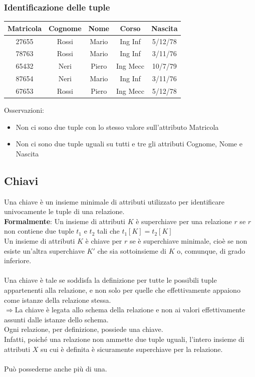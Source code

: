 \documentclass[../main.tex]{subfiles}
\begin{document}
	\subsubsection{Identificazione delle tuple}
	\begin{center}
		\begin{tabular}{ |c|c|c|c|c| }
			\hline
			\textbf{Matricola} & \textbf{Cognome} & \textbf{Nome} & \textbf{Corso} & \textbf{Nascita}\\
			\hline
			27655 & Rossi & Mario & Ing Inf & 5/12/78\\
			78763 & Rossi & Mario & Ing Inf & 3/11/76\\
			65432 & Neri & Piero & Ing Mecc & 10/7/79\\
			87654 & Neri & Mario & Ing Inf & 3/11/76\\
			67653 & Rossi & Piero & Ing Mecc & 5/12/78\\
			\hline
		\end{tabular}
	\end{center}
	Osservazioni:
	\begin{itemize}
		\item Non ci sono due tuple con lo stesso valore sull’attributo Matricola
		\item Non ci sono due tuple uguali su tutti e tre gli attributi Cognome, Nome e Nascita
	\end{itemize}
	\subsection{Chiavi}
	Una chiave è un insieme minimale di attributi utilizzato per identificare univocamente le tuple di una relazione.\\
	\textbf{Formalmente}: Un insieme di attributi $K$ è superchiave per una relazione $r$ se $r$ non contiene due tuple $t_1$ e $t_2$ tali che  $t_1[K] = t_2[K]$\\
	Un insieme di attributi $K$ è chiave per $r$ se è superchiave minimale, cioè se non esiste un’altra superchiave $K'$ che sia sottoinsieme di $K$ o, comunque, di grado inferiore.\\ \\
	Una chiave è tale se soddisfa la definizione per tutte le possibili tuple appartenenti alla relazione, e non solo per quelle che effettivamente appaiono come istanze della relazione stessa.\\
	$\Rightarrow$La chiave è legata allo schema della relazione e non ai valori effettivamente assunti dalle istanze dello schema.\\
	Ogni relazione, per definizione, possiede una chiave.\\
	Infatti, poiché una relazione non ammette due tuple uguali, l’intero insieme di attributi $X$ su cui è definita è sicuramente superchiave per la relazione.\\ \\
	Può possederne anche più di una.
\end{document}
